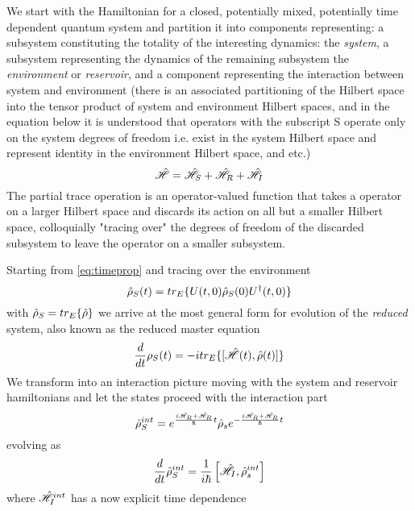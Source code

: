 We start with the Hamiltonian for a closed, potentially mixed, potentially time dependent quantum system and partition it into components representing: a subsystem constituting the totality of the interesting dynamics: the \emph{system}, a subsystem representing the dynamics of the remaining subsystem the \emph{environment} or \emph{reservoir}, and a component representing the interaction between system and environment (there is an associated partitioning of the Hilbert space into the tensor product of system and environment Hilbert spaces, and in the equation below it is understood that operators with the subscript S operate only on the system degrees of freedom i.e. exist in the system Hilbert space and represent identity in the environment Hilbert space, and etc.)
\begin{equation}
	\hat{\mathscr{H}} = \hat{\mathscr{H}}_S +\hat{\mathscr{H}}_R + \hat{\mathscr{H}}_I
\end{equation}
The partial trace operation is an operator-valued function that takes a operator on a larger Hilbert space and discards its action on all but a smaller Hilbert space, colloquially "tracing over" the degrees of freedom of the discarded subsystem to leave the operator on a smaller subsystem.

Starting from \cref{eq:timeprop} and tracing over the environment
\begin{equation}
	\hat{\rho}_S (t) = tr_E \{U(t, 0) \hat{\rho}_S (0) U^\dagger (t, 0) \}
\end{equation}
with $\hat{\rho}_S = tr_E\{\hat{\rho}\}$ we arrive at the most general form for evolution of the \emph{reduced} system, also known as the reduced master equation
\begin{equation}
	\frac{d}{dt} \rho_S (t) = -itr_E\{[\hat{\mathscr{H}}(t), \hat{\rho}(t)]\}
\end{equation}
We transform into an interaction picture moving with the system and reservoir hamiltonians and let the states proceed with the interaction part
\begin{equation}
	\hat{\rho}_S^{int} = e^{\frac{i\hat{\mathscr{H}}_R+\hat{\mathscr{H}}_R}{\hbar}t}\hat{\rho}_se^{-\frac{i\hat{\mathscr{H}}_R+\hat{\mathscr{H}}_R}{\hbar}t}
	\label{eq:densintdef}
\end{equation}
evolving as
\begin{equation}
	\frac{d}{dt}\hat{\rho}_S^{int} = \frac{1}{i\hbar}\left[\hat{\mathscr{H}}_{I}, \hat{\rho}_s^{int}\right]
\end{equation}
where $\hat{\mathscr{H}}_I^{int}$ has a now explicit time dependence
